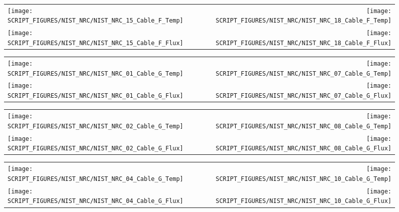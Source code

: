 \clearpage

\begin{figure}[p]
\begin{tabular*}{\textwidth}{l@{\extracolsep{\fill}}r}
\texttt{[image: SCRIPT\_FIGURES/NIST\_NRC/NIST\_NRC\_15\_Cable\_F\_Temp]} &
\texttt{[image: SCRIPT\_FIGURES/NIST\_NRC/NIST\_NRC\_18\_Cable\_F\_Temp]} \\
\texttt{[image: SCRIPT\_FIGURES/NIST\_NRC/NIST\_NRC\_15\_Cable\_F\_Flux]} &
\texttt{[image: SCRIPT\_FIGURES/NIST\_NRC/NIST\_NRC\_18\_Cable\_F\_Flux]}
\end{tabular*}
\label{NIST_NRC_F_15_and_18}
\end{figure}

\clearpage

\begin{figure}[p]
\begin{tabular*}{\textwidth}{l@{\extracolsep{\fill}}r}
\texttt{[image: SCRIPT\_FIGURES/NIST\_NRC/NIST\_NRC\_01\_Cable\_G\_Temp]} &
\texttt{[image: SCRIPT\_FIGURES/NIST\_NRC/NIST\_NRC\_07\_Cable\_G\_Temp]} \\
\texttt{[image: SCRIPT\_FIGURES/NIST\_NRC/NIST\_NRC\_01\_Cable\_G\_Flux]} &
\texttt{[image: SCRIPT\_FIGURES/NIST\_NRC/NIST\_NRC\_07\_Cable\_G\_Flux]}
\end{tabular*}
\label{NIST_NRC_G_1_and_7}
\end{figure}

\begin{figure}[p]
\begin{tabular*}{\textwidth}{l@{\extracolsep{\fill}}r}
\texttt{[image: SCRIPT\_FIGURES/NIST\_NRC/NIST\_NRC\_02\_Cable\_G\_Temp]} &
\texttt{[image: SCRIPT\_FIGURES/NIST\_NRC/NIST\_NRC\_08\_Cable\_G\_Temp]} \\
\texttt{[image: SCRIPT\_FIGURES/NIST\_NRC/NIST\_NRC\_02\_Cable\_G\_Flux]} &
\texttt{[image: SCRIPT\_FIGURES/NIST\_NRC/NIST\_NRC\_08\_Cable\_G\_Flux]}
\end{tabular*}
\label{NIST_NRC_G_2_and_8}
\end{figure}

\clearpage

\begin{figure}[p]
\begin{tabular*}{\textwidth}{l@{\extracolsep{\fill}}r}
\texttt{[image: SCRIPT\_FIGURES/NIST\_NRC/NIST\_NRC\_04\_Cable\_G\_Temp]} &
\texttt{[image: SCRIPT\_FIGURES/NIST\_NRC/NIST\_NRC\_10\_Cable\_G\_Temp]} \\
\texttt{[image: SCRIPT\_FIGURES/NIST\_NRC/NIST\_NRC\_04\_Cable\_G\_Flux]} &
\texttt{[image: SCRIPT\_FIGURES/NIST\_NRC/NIST\_NRC\_10\_Cable\_G\_Flux]}
\end{tabular*}
\label{NIST_NRC_G_4_and_10}
\end{figure}

